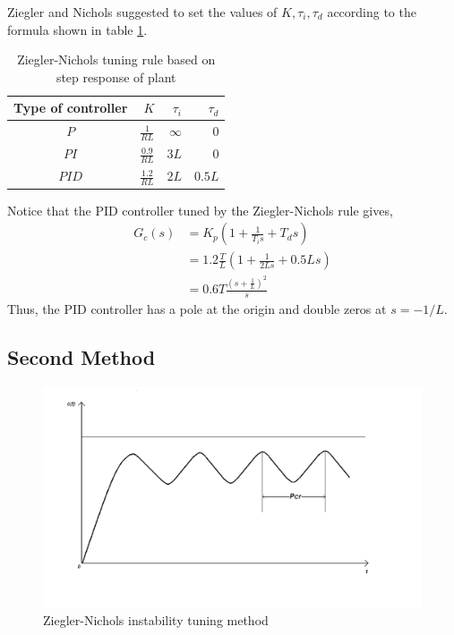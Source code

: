Ziegler and Nichols suggested to set the values of $K, \tau_i , \tau_d$  according to the formula shown in table \ref{table}.
\begin{table}
\begin{center}
\renewcommand{\arraystretch}{1.5}
\begin{tabular}{|c|r|r|r|}\hline
Type of
controller & $K$ & $\tau_i$ & $\tau_d$ \\ \hline
$P$ & $\frac{1}{RL}$ & $\infty$ & 0 \\ \hline
$PI$ & $\frac{0.9}{RL}$ & $3L$ & 0 \\\hline
$PID$ & $\frac{1.2}{RL}$ & $2L$ & $0.5L$ \\ \hline
\end{tabular}
\caption{Ziegler-Nichols tuning rule based on step response of plant}
\label{table}
\end{center}
\end{table}
Notice that the PID controller tuned by the Ziegler-Nichols rule gives,
\begin{align}
G_c(s)&=K_p\left(1+\frac 1{T_is}+T_ds\right)\\
&=1.2\frac {T}{L}\left( 1+\frac 1{2Ls}+0.5Ls\right)\\
&=0.6T\frac{\left(s+\frac 1{L}\right)^2}{s}
\end{align}
Thus, the PID controller has a pole at the origin and double zeros at $s= -1/L$.

\subsection{Second Method}
\begin{figure}
\centering
\includegraphics[width=\linewidth]{pid_manual/PIDUGtune}
\caption{Ziegler-Nichols instability tuning method}
\label{instability}
\end{figure}

